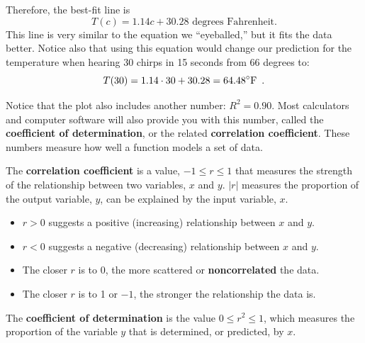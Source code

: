 \begin{example}
\begin{solution}
\begin{figure}[!ht]
      \caption{}
      \label{fig:lin-reg-crickets}
  \end{figure}
  Therefore, the best-fit line is
$$T(c) = 1.14 c + 30.28 \mbox{ degrees Fahrenheit.}$$
This line is very similar to the equation we ``eyeballed,'' but it fits the data better. Notice also that using this equation would change our prediction for the temperature when hearing 30 chirps in 15 seconds from 66 degrees to:
$$T(30) = 1.14\cdot 30 + 30.28 = 64.48^{\circ}{\mbox{F}} \enspace .$$
\end{solution}\end{example}

Notice that the plot also includes another number: $R^2 = 0.90$. Most calculators and computer software will also provide you with this number, called the {\bf coefficient of determination}, or the related \textbf{correlation coefficient}. These numbers measure how well a function models a set of data.

\begin{definition}
  The \textbf{correlation coefficient} is a value, $-1 \le r \le 1$ that measures the strength of the relationship between two variables, $x$ and $y$. $|r|$ measures the proportion of the output variable, $y$, can be explained by the input variable, $x$.
  \begin{itemize}
  \item $r  >  0$ suggests a positive (increasing) relationship between $x$ and $y$.
  \item $r  <  0$ suggests a negative (decreasing) relationship between $x$ and $y$.
  \item The closer $r$ is to 0, the more scattered or {\bf noncorrelated} the data.
  \item The closer $r$ is to 1 or $-1$, the stronger the relationship the data is.
\end{itemize}
  The {\bf coefficient of determination} is the value $0\le r^2 \le 1$, which measures the proportion of the variable $y$ that is determined, or predicted, by $x$.
\end{definition}


